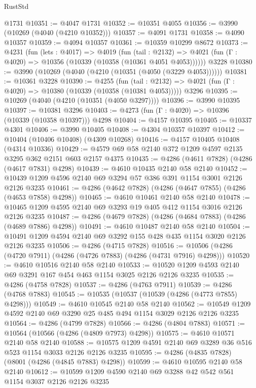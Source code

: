 \begin{lexlean}{RustStd}
\begin{coremodule}
    @1731
@10351 := @4047 @1731
@10352 := @10351 @4055
@10356 := @3990 (@10269 (@4040 (@4210 @10352)))
@10357 := @4091 @1731
@10358 := @4090 @10357
@10359 := @4094 @10357
@10361 := @10359 @10299 @8672
@10373 := @4231
    (fun (lets : @4017) =>
    @4019
      (fun (tail : @2132) =>
      @4021 (fun (Γ : @4020) => @10356 (@10339 (@10358 (@10361 @4051 @4053))))))
    @3228
@10380 := @3990 (@10269 (@4040 (@4210 (@10351 (@4050 (@3229 @4053))))))
@10381 := @10361 @3228
@10390 := @4255
    (fun (tail : @2132) => @4021 (fun (Γ : @4020) => @10380 (@10339 (@10358 (@10381 @4053)))))
    @3296
@10395 := @10269 (@4040 (@4210 (@10351 (@4050 @3297))))
@10396 := @3990 @10395
@10397 := @10381 @3296
@10403 := @4273 (fun (Γ : @4020) => @10396 (@10339 (@10358 @10397))) @4298
@10404 := @4157 @10395
@10405 := @10337 @4301
@10406 := @3990 @10405
@10408 := @4304 @10357 @10397
@10412 := @10404 (@10406 @10408) (@4309 @10268)
@10416 := @4157 @10405 @10408 (@4314 @10336)
@10429 := @4579 @69 @58 @2140 @372 @1209 @4597 @2135 @3295 @362 @2151 @603 @2157 @4375
@10435 := @4286 (@4611 @7828) (@4286 (@4617 @7831) @4298)
@10439 := @4610 @10435 @2140 @58 @2140
@10452 := @10439 @1209 @4596 @2140 @69 @3294 @57 @386 @391 @1154 @3001 @2126 @2126 @3235
@10461 := @4286 (@4642 @7828) (@4286 (@4647 @7855) (@4286 (@4653 @7858) @4298))
@10465 := @4610 @10461 @2140 @58 @2140
@10478 := @10465 @1209 @4595 @2140 @69 @3293 @19 @405 @412 @1154 @3016 @2126 @2126 @3235
@10487 := @4286 (@4679 @7828) (@4286 (@4684 @7883) (@4286 (@4689 @7886) @4298))
@10491 := @4610 @10487 @2140 @58 @2140
@10504 := @10491 @1209 @4594 @2140 @69 @3292 @155 @428 @435 @1154 @3020 @2126 @2126 @3235
@10506 := @4286 (@4715 @7828)
@10516 := @10506 (@4286 (@4720 @7911) (@4286 (@4726 @7883) (@4286 (@4731 @7916) @4298)))
@10520 := @4610 @10516 @2140 @58 @2140
@10533 := @10520 @1209 @4593 @2140 @69 @3291 @167 @454 @463 @1154 @3025 @2126 @2126 @3235
@10535 := @4286 (@4758 @7828)
@10537 := @4286 (@4763 @7911)
@10539 := @4286 (@4768 @7883)
@10545 := @10535 (@10537 (@10539 (@4286 (@4773 @7855) @4298)))
@10549 := @4610 @10545 @2140 @58 @2140
@10562 := @10549 @1209 @4592 @2140 @69 @3290 @25 @485 @494 @1154 @3029 @2126 @2126 @3235
@10564 := @4286 (@4799 @7828)
@10566 := @4286 (@4804 @7883)
@10571 := @10564 (@10566 (@4286 (@4809 @7973) @4298))
@10575 := @4610 @10571 @2140 @58 @2140
@10588 := @10575 @1209 @4591 @2140 @69 @3289 @36 @516 @523 @1154 @3033 @2126 @2126 @3235
@10595 := @4286 (@4835 @7828) (@8001 (@4286 (@4845 @7883) @4298))
@10599 := @4610 @10595 @2140 @58 @2140
@10612 := @10599 @1209 @4590 @2140 @69 @3288 @42 @542 @561 @1154 @3037 @2126 @2126 @3235

\end{coremodule}
\end{lexlean}
